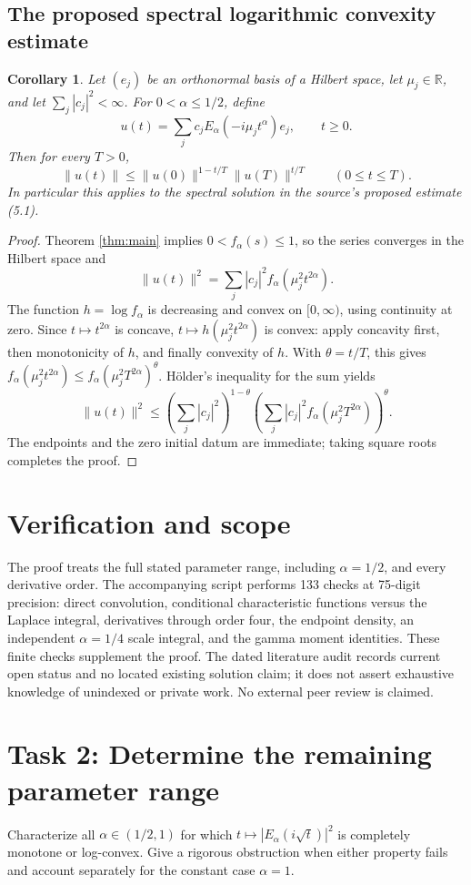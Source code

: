 \documentclass[11pt]{article}
\newtheorem{corollary}[theorem]{Corollary}
\newcommand{\R}{\mathbb R}
\begin{document}
\subsection*{The proposed spectral logarithmic convexity estimate}
\begin{corollary}
Let $(e_j)$ be an orthonormal basis of a Hilbert space, let $\mu_j\in\R$,
and let $\sum_j|c_j|^2<\infty$. For $0<\alpha\leq1/2$, define
\[
 u(t)=\sum_j c_jE_\alpha(-i\mu_jt^\alpha)e_j,\qquad t\geq0.
\]
Then for every $T>0$,
\[
 \|u(t)\|\leq\|u(0)\|^{1-t/T}\|u(T)\|^{t/T}
 \qquad(0\leq t\leq T).
\]
In particular this applies to the spectral solution in the source's
proposed estimate (5.1).
\end{corollary}
\begin{proof}
Theorem \ref{thm:main} implies $0<f_\alpha(s)\leq1$, so the series
converges in the Hilbert space and
\[
 \|u(t)\|^2=\sum_j|c_j|^2 f_\alpha(\mu_j^2t^{2\alpha}).
\]
The function $h=\log f_\alpha$ is decreasing and convex on $[0,\infty)$,
using continuity at zero. Since $t\mapsto t^{2\alpha}$ is concave,
$t\mapsto h(\mu_j^2t^{2\alpha})$ is convex: apply concavity first,
then monotonicity of $h$, and finally convexity of $h$.
With $\theta=t/T$, this gives
$f_\alpha(\mu_j^2t^{2\alpha})
 \leq f_\alpha(\mu_j^2T^{2\alpha})^\theta$.
H\"older's inequality for the sum yields
\[
 \|u(t)\|^2\leq
 \left(\sum_j|c_j|^2\right)^{1-\theta}
 \left(\sum_j|c_j|^2f_\alpha(\mu_j^2T^{2\alpha})\right)^\theta.
\]
The endpoints and the zero initial datum are immediate; taking square
roots completes the proof.
\end{proof}

\section*{Verification and scope}
The proof treats the full stated parameter range, including $\alpha=1/2$,
and every derivative order. The accompanying script performs 133 checks
at 75-digit precision: direct convolution, conditional characteristic
functions versus the Laplace integral, derivatives through order four,
the endpoint density, an independent $\alpha=1/4$ scale integral, and
the gamma moment identities. These finite checks supplement the proof.
The dated literature audit records current open status and no located
existing solution claim; it does not assert exhaustive knowledge of
unindexed or private work. No external peer review is claimed.

\section*{Task 2: Determine the remaining parameter range}
Characterize all $\alpha\in(1/2,1)$ for which
$t\mapsto|E_\alpha(i\sqrt t)|^2$ is completely monotone or log-convex.
Give a rigorous obstruction when either property fails and account
separately for the constant case $\alpha=1$.
\end{document}

